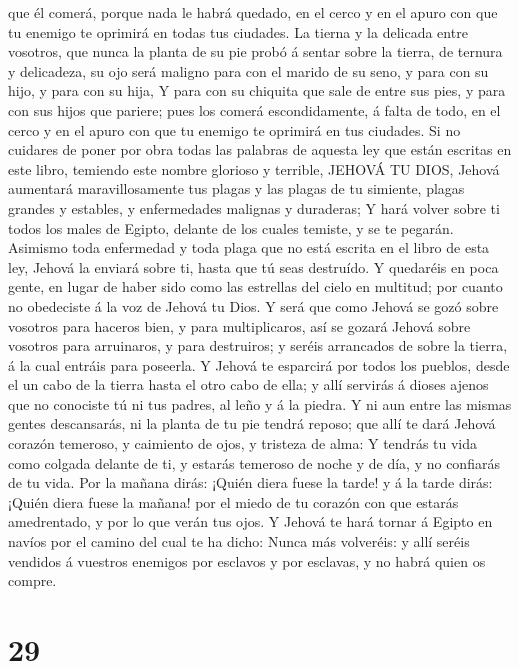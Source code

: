que él comerá, porque nada le habrá quedado, en el cerco y en el apuro
con que tu enemigo te oprimirá en todas tus ciudades.  La
tierna y la delicada entre vosotros, que nunca la planta de su pie probó
á sentar sobre la tierra, de ternura y delicadeza, su ojo será maligno
para con el marido de su seno, y para con su hijo, y para con su hija,
 Y para con su chiquita que sale de entre sus pies, y para
con sus hijos que pariere; pues los comerá escondidamente, á falta de
todo, en el cerco y en el apuro con que tu enemigo te oprimirá en tus
ciudades.  Si no cuidares de poner por obra todas las
palabras de aquesta ley que están escritas en este libro, temiendo este
nombre glorioso y terrible, JEHOVÁ TU DIOS,  Jehová
aumentará maravillosamente tus plagas y las plagas de tu simiente,
plagas grandes y estables, y enfermedades malignas y duraderas;
 Y hará volver sobre ti todos los males de Egipto, delante
de los cuales temiste, y se te pegarán.  Asimismo toda
enfermedad y toda plaga que no está escrita en el libro de esta ley,
Jehová la enviará sobre ti, hasta que tú seas destruído.  Y
quedaréis en poca gente, en lugar de haber sido como las estrellas del
cielo en multitud; por cuanto no obedeciste á la voz de Jehová tu Dios.
 Y será que como Jehová se gozó sobre vosotros para haceros
bien, y para multiplicaros, así se gozará Jehová sobre vosotros para
arruinaros, y para destruiros; y seréis arrancados de sobre la tierra, á
la cual entráis para poseerla.  Y Jehová te esparcirá por
todos los pueblos, desde el un cabo de la tierra hasta el otro cabo de
ella; y allí servirás á dioses ajenos que no conociste tú ni tus padres,
al leño y á la piedra.  Y ni aun entre las mismas gentes
descansarás, ni la planta de tu pie tendrá reposo; que allí te dará
Jehová corazón temeroso, y caimiento de ojos, y tristeza de alma:
 Y tendrás tu vida como colgada delante de ti, y estarás
temeroso de noche y de día, y no confiarás de tu vida.  Por
la mañana dirás: ¡Quién diera fuese la tarde! y á la tarde dirás: ¡Quién
diera fuese la mañana! por el miedo de tu corazón con que estarás
amedrentado, y por lo que verán tus ojos.  Y Jehová te hará
tornar á Egipto en navíos por el camino del cual te ha dicho: Nunca más
volveréis: y allí seréis vendidos á vuestros enemigos por esclavos y por
esclavas, y no habrá quien os compre.

\hypertarget{section-28}{%
\section{29}\label{section-28}}

